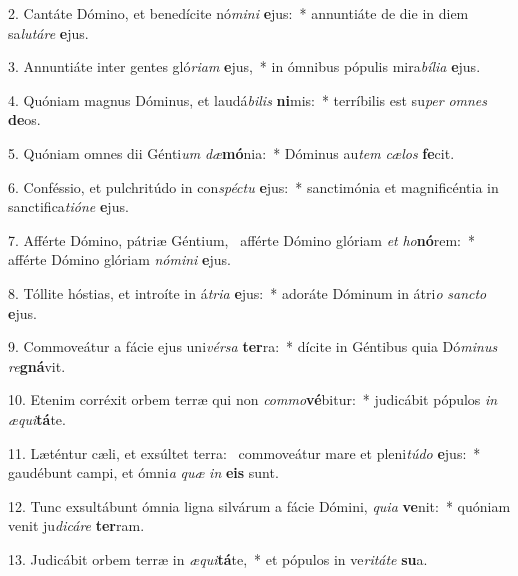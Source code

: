 2. Cantáte Dómino, et benedícite nó\textit{mi}\textit{ni} \textbf{e}jus:~*  annuntiáte de die in diem sa\textit{lu}\textit{tá}\textit{re} \textbf{e}jus.\

3. Annuntiáte inter gentes gló\textit{ri}\textit{am} \textbf{e}jus,~*  in ómnibus pópulis mira\textit{bí}\textit{li}\textit{a} \textbf{e}jus.\

4. Quóniam magnus Dóminus, et laudá\textit{bi}\textit{lis} \textbf{ni}mis:~*  terríbilis est su\textit{per} \textit{om}\textit{nes} \textbf{de}os.\

5. Quóniam omnes dii Génti\textit{um} \textit{dæ}\textbf{mó}nia:~*  Dóminus au\textit{tem} \textit{cæ}\textit{los} \textbf{fe}cit.\

6. Conféssio, et pulchritúdo in con\textit{spéc}\textit{tu} \textbf{e}jus:~*  sanctimónia et magnificéntia in sanctifica\textit{ti}\textit{ó}\textit{ne} \textbf{e}jus.\

7. Afférte Dómino, pátriæ Géntium, \dag\  afférte Dómino glóriam \textit{et} \textit{ho}\textbf{nó}rem:~*  afférte Dómino glóriam \textit{nó}\textit{mi}\textit{ni} \textbf{e}jus.\

8. Tóllite hóstias, et introíte in á\textit{tri}\textit{a} \textbf{e}jus:~*  adoráte Dóminum in átri\textit{o} \textit{sanc}\textit{to} \textbf{e}jus.\

9. Commoveátur a fácie ejus uni\textit{vér}\textit{sa} \textbf{ter}ra:~*  dícite in Géntibus quia Dó\textit{mi}\textit{nus} \textit{re}\textbf{gná}vit.\

10. Etenim corréxit orbem terræ qui non \textit{com}\textit{mo}\textbf{vé}bitur:~*  judicábit pópulos \textit{in} \textit{æ}\textit{qui}\textbf{tá}te.\

11. Læténtur cæli, et exsúltet terra: \dag\  commoveátur mare et pleni\textit{tú}\textit{do} \textbf{e}jus:~*  gaudébunt campi, et ómni\textit{a} \textit{quæ} \textit{in} \textbf{e}\textbf{is} sunt.\

12. Tunc exsultábunt ómnia ligna silvárum a fácie Dómini, \textit{qui}\textit{a} \textbf{ve}nit:~*  quóniam venit ju\textit{di}\textit{cá}\textit{re} \textbf{ter}ram.\

13. Judicábit orbem terræ in \textit{æ}\textit{qui}\textbf{tá}te,~*  et pópulos in ve\textit{ri}\textit{tá}\textit{te} \textbf{su}a.\

